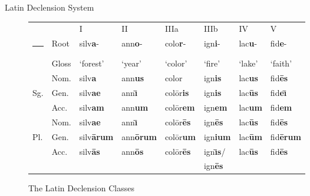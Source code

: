 \documentclass[final]{beamer}
\makeatletter
\newlength{\onecolwid}
\newcommand{\thickhline}{%
    \noalign {\ifnum 0=`}\fi \hrule height 1pt
    \futurelet \reserved@a \@xhline
}
\makeatother
\begin{document}
\begin{frame}[t]
\begin{columns}[t]
\begin{column}{\onecolwid}
\begin{block}{Latin Declension System}

\begin{figure}[height=.5\textheight]
	\footnotesize
	\begin{tabular}{ll| llllll}
				&	&	I		&	II		&	IIIa		&	IIIb		&	IV		&	V	\\ \thickhline
		& Root		&	silv\textbf{a}-		&	ann\textbf{o}-	&	colo\textbf{r}-	&	ign\textbf{i}-		&	lac\textbf{u}-		&	fid\textbf{e}-	\\
		& Gloss		&	`forest'	&	`year'	&	`color'	&	`fire'		&	`lake'	&	`faith'	\\ \hline
		& Nom.	&	silv\textbf{a}		&	ann\textbf{us}&	color	&	ign\textbf{is}	&	lac\textbf{us} &	fid\textbf{\=es} \\
		Sg. & Gen.		&	silv\textbf{ae} 	&	ann\textbf{\=\i}&	col\=or\textbf{is}&	ign\textbf{is}	&	lac\textbf{\=us}&	fid\textbf{e\=\i} \\
		& Acc.		&	silv\textbf{am}	&	ann\textbf{um}&	col\=or\textbf{em}& ign\textbf{em}&	lac\textbf{um}&	fid\textbf{em}	\\  \hline
		& Nom.	&	silv\textbf{ae}		&	ann\textbf{\=\i}&	col\=or\textbf{\=es}& ign\textbf{\=es}&	lac\textbf{\=us}&	fid\textbf{\=es}		\\
		Pl. & Gen.		&	silv\textbf{\=arum} 	&	ann\textbf{\=orum}	&	col\=or\textbf{um}&ign\textbf{ium}& lac\textbf{\=um}&	fid\textbf{\=erum}\\
		& Acc.		&	silv\textbf{\=as}	&	ann\textbf{\=os}&	col\=or\textbf{\=es}&	ign\textbf{\=\i s}/&	lac\textbf{\=us}&	fid\textbf{\=es} \\
		&			&				&			&				&	ign\textbf{\=es}&		& \\		
	\end{tabular}
	\caption{The Latin Declension Classes}
	\label{fig:latdec}
\end{figure}


\end{block}
\end{column}
\end{columns}
\end{frame}
\end{document}
